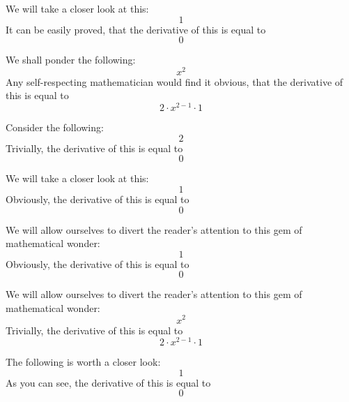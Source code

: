 \documentclass{article}
\begin{document}
We will take a closer look at this:
\begin{equation}
1 
\end{equation}
It can be easily proved, that the derivative of this is equal to
\begin{equation}
0 
\end{equation}

We shall ponder the following:
\begin{equation}
x ^{2 } 
\end{equation}
Any self-respecting mathematician would find it obvious, that the derivative of this is equal to
\begin{equation}
2 \cdot x ^{2 - 1 } \cdot 1 
\end{equation}

Consider the following:
\begin{equation}
2 
\end{equation}
Trivially, the derivative of this is equal to
\begin{equation}
0 
\end{equation}

We will take a closer look at this:
\begin{equation}
1 
\end{equation}
Obviously, the derivative of this is equal to
\begin{equation}
0 
\end{equation}

We will allow ourselves to divert the reader's attention to this gem of mathematical wonder:
\begin{equation}
1 
\end{equation}
Obviously, the derivative of this is equal to
\begin{equation}
0 
\end{equation}

We will allow ourselves to divert the reader's attention to this gem of mathematical wonder:
\begin{equation}
x ^{2 } 
\end{equation}
Trivially, the derivative of this is equal to
\begin{equation}
2 \cdot x ^{2 - 1 } \cdot 1 
\end{equation}

The following is worth a closer look:
\begin{equation}
1 
\end{equation}
As you can see, the derivative of this is equal to
\begin{equation}
0 
\end{equation}
\end{document}
